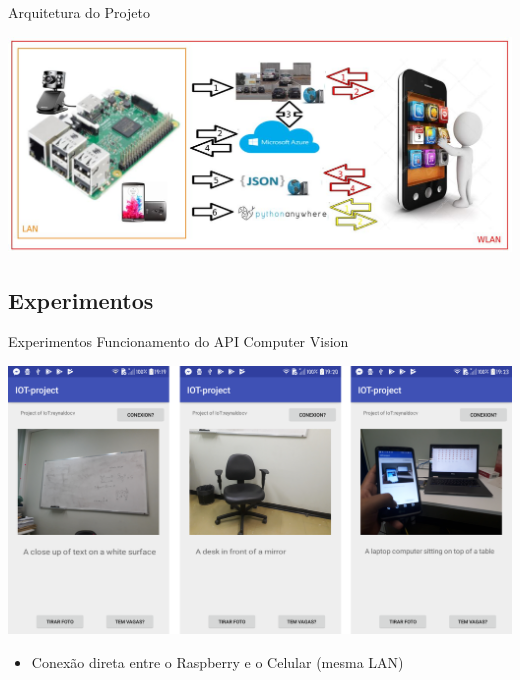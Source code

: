\documentclass{beamer}
\begin{document}
\begin{frame}{Arquitetura do Projeto}


\begin{center}
\includegraphics[width=1\textwidth]{img/estrutura.jpeg}   
\end{center}

\end{frame}



\subsection{Experimentos }

\begin{frame}{Experimentos}
Funcionamento do API Computer Vision

\begin{center}
\includegraphics[width=.9\textwidth]{img/app_1.png}   
\end{center}
\begin{itemize}\tiny
 \item Conexão direta entre o Raspberry e o Celular (mesma LAN)  
\end{itemize}

\end{frame}
\end{document}
